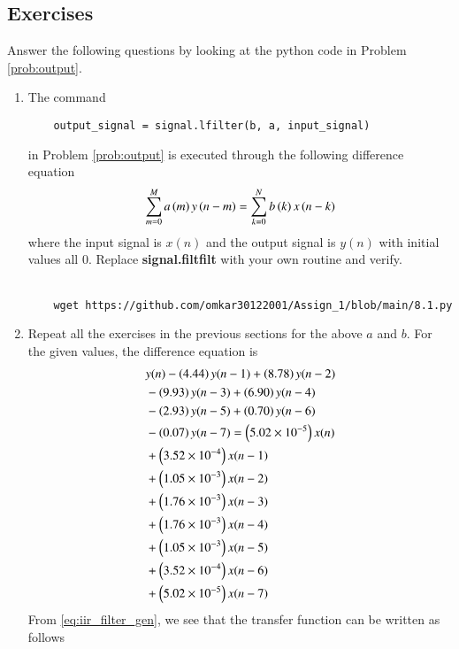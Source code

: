 \documentclass[journal,12pt,twocolumn]{IEEEtran}
\renewcommand\thesection{\arabic{section}}
\begin{document}
\begin{enumerate}[label=\thesection.\arabic*
	,ref=\thesection.\theenumi]
\section{Exercises}
Answer the following questions by looking at the python code in Problem \ref{prob:output}.
\begin{enumerate}[label=\thesection.\arabic*]
	\item
	The command
	\begin{lstlisting}
	output_signal = signal.lfilter(b, a, input_signal)
	\end{lstlisting}
	in Problem \ref{prob:output} is executed through the following difference equation
	\begin{equation}
		\label{eq:iir_filter_gen}
		\sum _{m=0}^{M}a\left(m\right)y\left(n-m\right)=\sum _{k=0}^{N}b\left(k\right)x\left(n-k\right)
	\end{equation}
	where the input signal is $x(n)$ and the output signal is $y(n)$ with initial values all 0. Replace
	\textbf{signal.filtfilt} with your own routine and verify.\\
	\solution \\
	\begin{lstlisting}
	wget https://github.com/omkar30122001/Assign_1/blob/main/8.1.py
	\end{lstlisting}
	\item Repeat all the exercises in the previous sections for the above $a$ and $b$.
	\solution For the given values, the difference equation is
\begin{align*}
&y(n) - \left(4.44\right)y(n - 1) + \left(8.78\right)y(n - 2) \nonumber \\
&- \left(9.93\right)y(n - 3) + \left(6.90\right)y(n - 4) \nonumber \\
&- \left(2.93\right)y(n - 5) \nonumber + \left(0.70\right)y(n - 6) \nonumber \\
&- \left(0.07\right)y(n - 7) = \left(5.02 \times 10^{-5}\right)x(n) \nonumber \\
&+ \left(3.52 \times 10^{-4}\right)x(n - 1)  \\
&+ \left(1.05 \times 10^{-3}\right)x(n - 2) \nonumber \\
&+ \left(1.76 \times 10^{-3}\right)x(n - 3) \\
&+ \left(1.76 \times 10^{-3}\right)x(n - 4) \nonumber \\
&+ \left(1.05 \times 10^{-3}\right)x(n - 5) \\
&+ \left(3.52 \times 10^{-4}\right)x(n - 6) \nonumber \\
&+ \left(5.02 \times 10^{-5}\right)x(n - 7)
\end{align*}
	From \eqref{eq:iir_filter_gen}, we see that the transfer function can be written as follows

\end{enumerate}
\end{enumerate}
\end{document}
